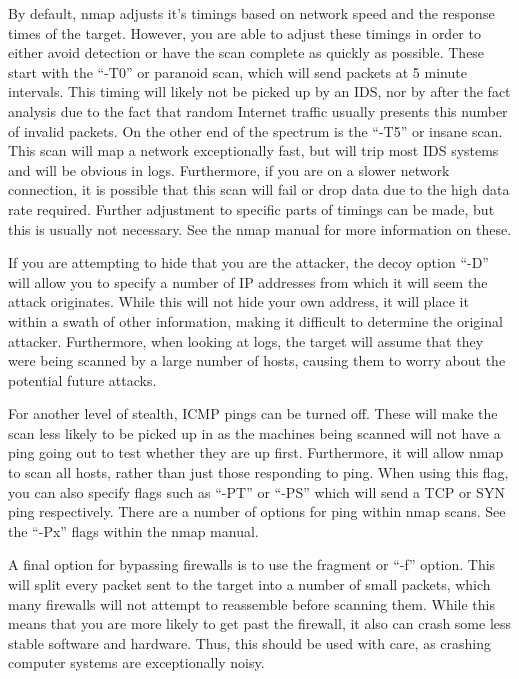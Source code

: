 			By default, nmap adjusts it's timings based on network speed and the response times of the target. 
			However, you are able to adjust these timings in order to either avoid detection or have the scan complete as quickly as possible. 
			These start with the ``-T0'' or paranoid scan, which will send packets at 5 minute intervals. 
			This timing will likely not be picked up by an IDS, nor by after the fact analysis due to the fact that random Internet traffic usually presents this number of invalid packets. 
			On the other end of the spectrum is the ``-T5''  or insane scan. 
			This scan will map a network exceptionally fast, but will trip most IDS systems and will be obvious in logs. 
			Furthermore, if you are on a slower network connection, it is possible that this scan will fail or drop data due to the high data rate required. 
			Further adjustment to specific parts of timings can be made, but this is usually not necessary. 
			See the nmap manual for more information on these. 

			If you are attempting to hide that you are the attacker, the decoy option ``-D'' will allow you to specify a number of IP addresses from which it will seem the attack originates.
			While this will not hide your own address, it will place it within a swath of other information, making it difficult to determine the original attacker. 
			Furthermore, when looking at logs, the target will assume that they were being scanned by a large number of hosts, causing them to worry about the potential future attacks. 

			For another level of stealth, ICMP pings can be turned off.
			These will make the scan less likely to be picked up in as the machines being scanned will not have a ping going out to test whether they are up first. 
			Furthermore, it will allow nmap to scan all hosts, rather than just those responding to ping. 
			When using this flag, you can also specify flags such as ``-PT'' or ``-PS'' which will send a TCP or SYN ping respectively. 
			There are a number of options for ping within nmap scans. See the ``-Px'' flags within the nmap manual. 

			A final option for bypassing firewalls is to use the fragment or ``-f'' option. 
			This will split every packet sent to the target into a number of small packets, which many firewalls will not attempt to reassemble before scanning them. 
			While this means that you are more likely to get past the firewall, it also can crash some less stable software and hardware. 
			Thus, this should be used with care, as crashing computer systems are exceptionally noisy. 
